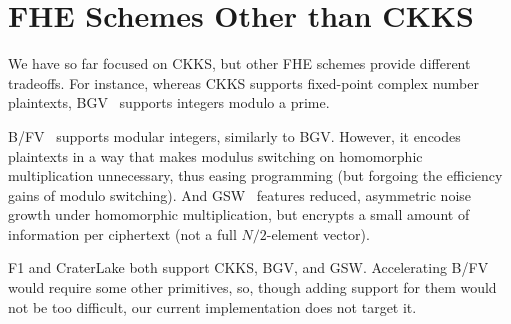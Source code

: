 \section{FHE Schemes Other than CKKS}
\label{sec:fhe_others}

We have so far focused on CKKS, but other FHE schemes provide different
tradeoffs. For instance, whereas CKKS supports fixed-point complex number
plaintexts, BGV~\cite{brakerski:toct14:leveled} supports integers modulo a prime.

B/FV~\cite{brakerski:crypto12:fully,fan:iacr12:somewhat} supports modular
integers, similarly to BGV. However, it encodes plaintexts in a way that makes
modulus switching on homomorphic multiplication unnecessary, thus easing
programming (but forgoing the efficiency gains of modulo switching). And
GSW~\cite{gentry:crypto13:homomorphic} features reduced, asymmetric noise
growth under homomorphic multiplication, but encrypts a small amount of
information per ciphertext (not a full $N/2$-element vector).

F1 and CraterLake both support CKKS, BGV, and GSW. Accelerating B/FV would
require some other primitives, so, though adding support for them would not be
too difficult, our current implementation does not target it.
